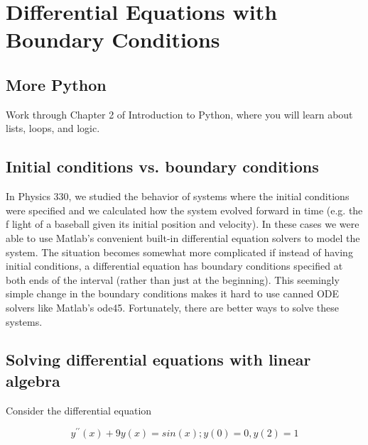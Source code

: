 	
\chapter*{Differential Equations with Boundary Conditions}
\section*{More Python}

\begin{problem} \label{P2.1}Work through Chapter 2 of Introduction to Python, where you will learn about lists, loops, and logic.
\end{problem}
\section*{Initial conditions vs. boundary conditions}
In Physics 330, we studied the behavior of systems where the initial conditions were specified and we calculated how the system evolved forward in time (e.g. the f light of a baseball given its initial position and velocity). In these cases we were able to use Matlab\rq s convenient built-in differential equation solvers to model the system. The situation becomes somewhat more complicated if instead of having initial conditions, a differential equation has boundary conditions specified at both ends of the interval (rather than just at the beginning). This seemingly simple change in the boundary conditions makes it hard to use canned ODE solvers like Matlab\rq s ode45. Fortunately, there are better ways to solve these systems.

\section*{Solving differential equations with linear algebra}

Consider the differential equation

\begin{equation} \label{eq:21}
	y^{\prime\prime}(x) + 9y(x) = sin(x) ; y(0) = 0, y(2) = 1
\end{equation}


